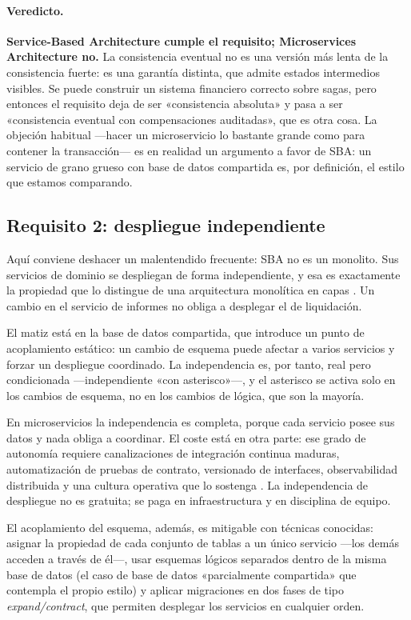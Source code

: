 \paragraph{Veredicto.} \textbf{Service-Based Architecture cumple el requisito; Microservices Architecture no.} La consistencia eventual no es una versión más lenta de la consistencia fuerte: es una garantía distinta, que admite estados intermedios visibles. Se puede construir un sistema financiero correcto sobre sagas, pero entonces el requisito deja de ser «consistencia absoluta» y pasa a ser «consistencia eventual con compensaciones auditadas», que es otra cosa. La objeción habitual ---hacer un microservicio lo bastante grande como para contener la transacción--- es en realidad un argumento a favor de SBA: un servicio de grano grueso con base de datos compartida es, por definición, el estilo que estamos comparando.

\subsection{Requisito 2: despliegue independiente}

Aquí conviene deshacer un malentendido frecuente: SBA no es un monolito. Sus servicios de dominio se despliegan de forma independiente, y esa es exactamente la propiedad que lo distingue de una arquitectura monolítica en capas \parencite{richardsford2020}. Un cambio en el servicio de informes no obliga a desplegar el de liquidación.

El matiz está en la base de datos compartida, que introduce un punto de acoplamiento estático: un cambio de esquema puede afectar a varios servicios y forzar un despliegue coordinado. La independencia es, por tanto, real pero condicionada ---independiente «con asterisco»---, y el asterisco se activa solo en los cambios de esquema, no en los cambios de lógica, que son la mayoría.

En microservicios la independencia es completa, porque cada servicio posee sus datos y nada obliga a coordinar. El coste está en otra parte: ese grado de autonomía requiere canalizaciones de integración continua maduras, automatización de pruebas de contrato, versionado de interfaces, observabilidad distribuida y una cultura operativa que lo sostenga \parencite{richardsford2020}. La independencia de despliegue no es gratuita; se paga en infraestructura y en disciplina de equipo.

El acoplamiento del esquema, además, es mitigable con técnicas conocidas: asignar la propiedad de cada conjunto de tablas a un único servicio ---los demás acceden a través de él---, usar esquemas lógicos separados dentro de la misma base de datos (el caso de base de datos «parcialmente compartida» que contempla el propio estilo) y aplicar migraciones en dos fases de tipo \emph{expand/contract}, que permiten desplegar los servicios en cualquier orden.

